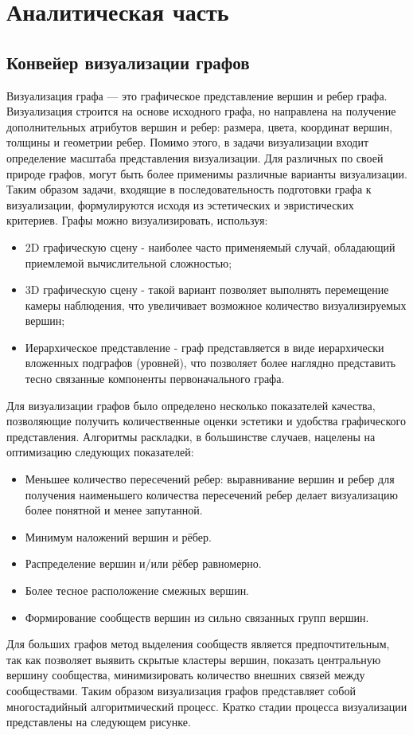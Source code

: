 \section{Аналитическая часть}

\subsection{Конвейер визуализации графов}
Визуализация графа — это графическое представление вершин и ребер графа. Визуализация строится на основе исходного графа, но направлена на получение дополнительных атрибутов вершин и ребер: размера, цвета, координат вершин, толщины и геометрии ребер. Помимо этого, в задачи визуализации входит определение масштаба представления визуализации. Для различных по своей природе графов, могут быть более применимы различные варианты визуализации. Таким образом задачи, входящие в последовательность подготовки графа к визуализации, формулируются исходя из эстетических и эвристических критериев. Графы можно визуализировать, используя:
\begin{itemize}
	\item 2D графическую сцену - наиболее часто применяемый случай, обладающий приемлемой вычислительной сложностью;
	\item 3D графическую сцену - такой вариант позволяет выполнять перемещение камеры наблюдения, что увеличивает возможное количество визуализируемых вершин;
	\item Иерархическое представление - граф представляется в виде иерархически вложенных подграфов (уровней), что позволяет более наглядно представить тесно связанные компоненты первоначального графа.
\end{itemize}
\par Для визуализации графов было определено несколько показателей качества, позволяющие получить количественные оценки эстетики и удобства графического представления. Алгоритмы раскладки, в большинстве случаев, нацелены на оптимизацию следующих показателей:
\begin{itemize}
	\item Меньшее количество пересечений ребер: выравнивание вершин и ребер для получения наименьшего количества пересечений ребер делает визуализацию более понятной и менее запутанной.
	\item Минимум наложений вершин и рёбер.
	\item Распределение вершин и/или рёбер равномерно.
	\item Более тесное расположение смежных вершин.
	\item Формирование сообществ вершин из сильно связанных групп вершин.
\end{itemize}
\par Для больших графов метод выделения сообществ является предпочтительным, так как позволяет выявить скрытые кластеры вершин, показать центральную вершину сообщества, минимизировать количество внешних связей между сообществами.
Таким образом визуализация графов представляет собой многостадийный алгоритмический процесс. Кратко стадии процесса визуализации представлены на следующем рисунке.
